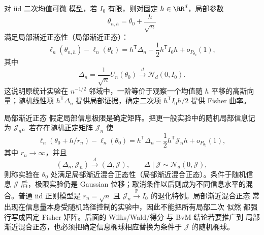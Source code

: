 \begin{theorem}
对 iid 二次均值可微 模型，若 $I_0$ 有限，则对固定 $h\in\RR^d$，局部参数
\[
 \theta_{n,h}=\theta_0+\frac{h}{\sqrt n}
\]
满足局部渐近正态性（局部渐近正态）：
\begin{equation}\label{eq:math-stat-lan-vector}
 \ell_n(\theta_{n,h})-\ell_n(\theta_0)
 =h^{\mathsf T}\Delta_n
 -\frac12h^{\mathsf T}I_0h
 +o_{P_{\theta_0}}(1),
\end{equation}
其中
\begin{equation}\label{eq:math-stat-score-clt}
 \Delta_n
 =\frac1{\sqrt n}U_n(\theta_0)
 \xrightarrow{d}\mathcal N_d(0,I_0).
\end{equation}
这说明原统计实验在 $n^{-1/2}$ 邻域中，一阶等价于观察一个均值随 $h$ 平移的高斯向量；随机线性项 $h^{\mathsf T}\Delta_n$ 提供局部证据，确定二次项 $h^{\mathsf T}I_0h/2$ 提供 Fisher 曲率。
\end{theorem}

\begin{definition}
局部渐近正态 假定局部信息极限是确定矩阵。把更一般实验中的随机局部信息记为 $\mathcal J_n$。若存在随机正定矩阵 $\mathcal J_n$ 使
\begin{equation*}\ell_n(\theta_0+h/r_n)-\ell_n(\theta_0)
 =h^{\mathsf T}\Delta_n
 -\frac12h^{\mathsf T}\mathcal J_nh
 +o_{P_{\theta_0}}(1),
\end{equation*}
其中 $r_n\to\infty$，并且
\[
 (\Delta_n,\mathcal J_n)\xrightarrow{d}(\Delta,\mathcal J),
 \qquad
 \Delta\mid\mathcal J\sim\mathcal N_d(0,\mathcal J),
\]
则称实验在 $\theta_0$ 处满足局部渐近混合正态性（局部渐近混合正态）。条件于随机信息 $\mathcal J$ 后，极限实验仍是 Gaussian 位移；取消条件以后则成为不同信息水平的混合。普通 iid 正则模型是 $r_n=\sqrt n$ 且 $\mathcal J_n\xrightarrow{\mathbb P} I_0$ 的退化特例。局部渐近混合正态 常出现在信息量本身受随机路径控制的实验中，因此不能把所有局部二次 似然 都强行写成固定 Fisher 矩阵。后面的 Wilks/Wald/得分 与 BvM 结论若要推广到 局部渐近混合正态，也必须把确定信息椭球相应替换为条件于 $\mathcal J$ 的随机椭球。
\end{definition}

